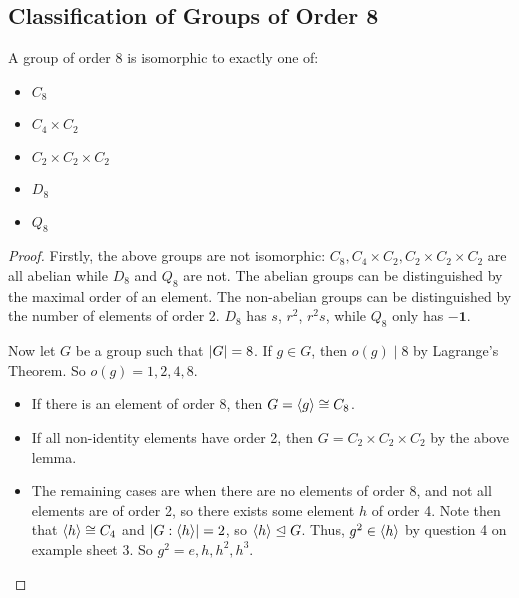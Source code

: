 \documentclass{article}
\begin{document}
\subsection{Classification of Groups of Order 8}
\begin{theorem}
	A group of order 8 is isomorphic to exactly one of:
	\begin{itemize}
		\item $C_8$
		\item $C_4 \times C_2$
		\item $C_2 \times C_2 \times C_2$
		\item $D_8$
		\item $Q_8$
	\end{itemize}
\end{theorem}
\begin{proof}
	Firstly, the above groups are not isomorphic: $C_8, C_4 \times C_2, C_2 \times C_2 \times C_2$ are all abelian while $D_8$ and $Q_8$ are not. The abelian groups can be distinguished by the maximal order of an element. The non-abelian groups can be distinguished by the number of elements of order 2. $D_8$ has $s$, $r^2$, $r^2s$, while $Q_8$ only has $-\bm 1$.

	Now let $G$ be a group such that $\abs{G} = 8$. If $g \in G$, then $o(g) \mid 8$ by Lagrange's Theorem. So $o(g) = 1, 2, 4, 8$.
	\begin{itemize}
		\item If there is an element of order 8, then $G = \langle g \rangle \cong C_8$.
		\item If all non-identity elements have order 2, then $G = C_2 \times C_2 \times C_2$ by the above lemma.
		\item The remaining cases are when there are no elements of order 8, and not all elements are of order 2, so there exists some element $h$ of order 4. Note then that $\langle h \rangle \cong C_4$ and $\abs{G:\langle h \rangle} = 2$, so $\langle h \rangle \trianglelefteq G$. Thus, $g^2 \in \langle h \rangle$ by question 4 on example sheet 3. So $g^2 = e, h, h^2, h^3$.


\end{itemize}
\end{proof}
\end{document}
